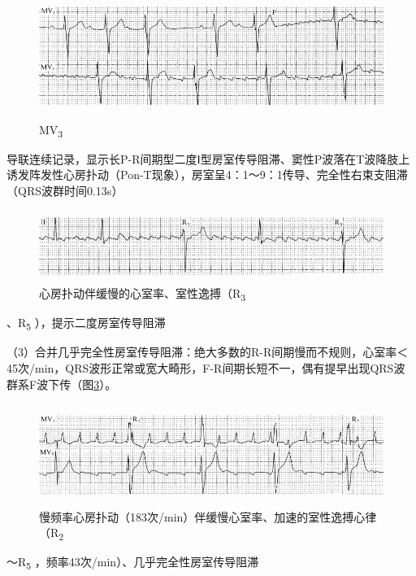 \begin{figure}[!htbp]
 \centering
 \includegraphics[width=5.58333in,height=1.59375in]{./images/Image00216.jpg}
 \captionsetup{justification=centering}
 \caption{MV\textsubscript{3}}
 \label{fig13-8}
  \end{figure} 
导联连续记录，显示长P-R间期型二度Ⅰ型房室传导阻滞、窦性P波落在T波降肢上诱发阵发性心房扑动（Pon-T现象），房室呈4：1～9：1传导、完全性右束支阻滞（QRS波群时间0.13s）

\begin{figure}[!htbp]
 \centering
 \includegraphics[width=5.58333in,height=0.91667in]{./images/Image00217.jpg}
 \captionsetup{justification=centering}
 \caption{心房扑动伴缓慢的心室率、室性逸搏（R\textsubscript{3}}
 \label{fig13-9}
  \end{figure} 
、R\textsubscript{5} ），提示二度房室传导阻滞

（3）合并几乎完全性房室传导阻滞：绝大多数的R-R间期慢而不规则，心室率＜45次/min，QRS波形正常或宽大畸形，F-R间期长短不一，偶有提早出现QRS波群系F波下传（图\ref{fig13-10}）。

\begin{figure}[!htbp]
 \centering
 \includegraphics[width=5.58333in,height=1.30208in]{./images/Image00218.jpg}
 \captionsetup{justification=centering}
 \caption{慢频率心房扑动（183次/min）伴缓慢心室率、加速的室性逸搏心律（R\textsubscript{2}}
 \label{fig13-10}
  \end{figure} 
～R\textsubscript{5} ，频率43次/min）、几乎完全性房室传导阻滞

